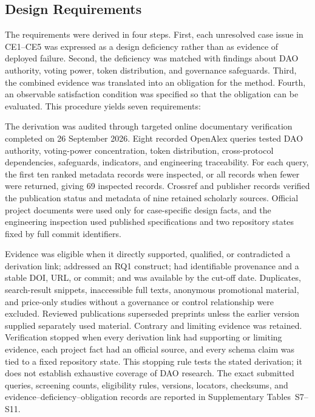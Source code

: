 \documentclass[referee,sn-basic]{sn-jnl}
\begin{document}
\subsection{Design Requirements}\label{subsec:design-requirements}

The requirements were derived in four steps. First, each unresolved case issue
in CE1--CE5 was expressed as a design deficiency rather than as evidence of
deployed failure. Second, the deficiency was matched with findings about DAO
authority, voting power, token distribution, and governance safeguards. Third,
the combined evidence was translated into an obligation for the method. Fourth,
an observable satisfaction condition was specified so that the obligation can
be evaluated. This procedure yields seven requirements:

The derivation was audited through targeted online documentary verification
completed on 26 September 2026. Eight recorded OpenAlex queries tested DAO
authority, voting-power concentration, token distribution, cross-protocol
dependencies, safeguards, indicators, and engineering traceability. For each
query, the first ten ranked metadata records were inspected, or all records
when fewer were returned, giving 69 inspected records. Crossref and publisher
records verified the publication status and metadata of nine retained scholarly
sources. Official project documents were used only for case-specific design
facts, and the engineering inspection used published specifications and two
repository states fixed by full commit identifiers.

Evidence was eligible when it directly supported, qualified, or contradicted a
derivation link; addressed an RQ1 construct; had identifiable provenance and a
stable DOI, URL, or commit; and was available by the cut-off date. Duplicates,
search-result snippets, inaccessible full texts, anonymous promotional
material, and price-only studies without a governance or control relationship
were excluded. Reviewed publications superseded preprints unless the earlier
version supplied separately used material. Contrary and limiting evidence was
retained. Verification stopped when every derivation link had supporting or
limiting evidence, each project fact had an official source, and every schema
claim was tied to a fixed repository state. This stopping rule tests the stated
derivation; it does not establish exhaustive coverage of DAO research. The
exact submitted queries, screening counts, eligibility rules, versions,
locators, checksums, and evidence--deficiency--obligation records are reported
in Supplementary Tables~S7--S11.
\end{document}
